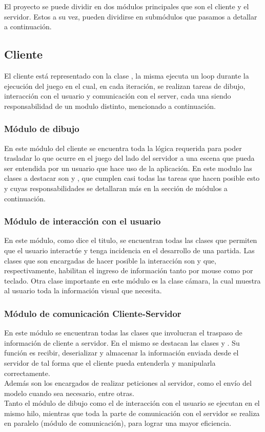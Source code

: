 El proyecto se puede dividir en dos módulos principales que son el cliente y
el servidor. Estos a su vez, pueden dividirse en submódulos que pasamos a
detallar a continuación.
\subsection{Cliente}
    El cliente está representado con la clase , la misma ejecuta un
    loop durante la ejecución del juego en el cual, en cada iteración, se
    realizan tareas de dibujo, interacción con el usuario y comunicación con el
    server, cada una siendo responsabilidad de un modulo distinto, mencionado a
    continuación.
    \subsubsection{Módulo de dibujo}
        En este módulo del cliente se encuentra toda la lógica requerida para
        poder trasladar lo que ocurre en el juego del lado del servidor a una
        escena que pueda ser entendida por un usuario que hace uso de la
        aplicación. En este modulo las clases a destacar son  y
        , que cumplen casi todas las tareas que hacen posible
        esto y cuyas responsabilidades se detallaran más en la sección de
        módulos a continuación.
    \subsubsection{Módulo de interacción con el usuario}
        En este módulo, como dice el titulo, se encuentran todas las clases que
        permiten que el usuario interactúe y tenga incidencia en el desarrollo
        de una partida. Las clases que son encargadas de hacer posible la
        interacción son  y
         que, respectivamente, habilitan el
        ingreso de información tanto por mouse como por teclado. Otra clase
        importante en este módulo es la clase cámara, la cual muestra al usuario
        toda la información visual que necesita.
    \subsubsection{Módulo de comunicación Cliente-Servidor}
        En este módulo se encuentran todas las clases que involucran el traspaso
        de información de cliente a servidor. En el mismo se destacan las clases
         y . Su función es
        recibir, deserializar y almacenar la información enviada desde el
        servidor de tal forma que el cliente pueda entenderla y manipularla
        correctamente.\\
        Además son los encargados de realizar peticiones al servidor, como el
        envío del modelo cuando sea necesario, entre otras.\\
        Tanto el módulo de dibujo como el de interacción con el usuario se
        ejecutan en el mismo hilo, mientras que toda la parte de comunicación
        con el servidor se realiza en paralelo (módulo de comunicación), para
        lograr una mayor eficiencia.

